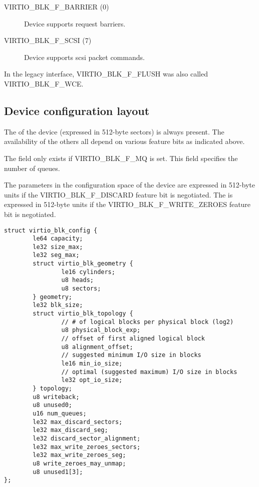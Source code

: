 \begin{description}
\item[VIRTIO_BLK_F_BARRIER (0)] Device supports request barriers.

\item[VIRTIO_BLK_F_SCSI (7)] Device supports scsi packet commands.
\end{description}

\begin{note}
  In the legacy interface, VIRTIO_BLK_F_FLUSH was also
  called VIRTIO_BLK_F_WCE.
\end{note}

\subsection{Device configuration layout}\label{sec:Device Types / Block Device / Device configuration layout}

The  of the device (expressed in 512-byte sectors) is always
present. The availability of the others all depend on various feature
bits as indicated above.

The field  only exists if VIRTIO_BLK_F_MQ is set. This field specifies
the number of queues.

The parameters in the configuration space of the device 
 are expressed in 512-byte units if the
VIRTIO_BLK_F_DISCARD feature bit is negotiated. The 
is expressed in 512-byte units if the VIRTIO_BLK_F_WRITE_ZEROES feature
bit is negotiated.

\begin{lstlisting}
struct virtio_blk_config {
        le64 capacity;
        le32 size_max;
        le32 seg_max;
        struct virtio_blk_geometry {
                le16 cylinders;
                u8 heads;
                u8 sectors;
        } geometry;
        le32 blk_size;
        struct virtio_blk_topology {
                // # of logical blocks per physical block (log2)
                u8 physical_block_exp;
                // offset of first aligned logical block
                u8 alignment_offset;
                // suggested minimum I/O size in blocks
                le16 min_io_size;
                // optimal (suggested maximum) I/O size in blocks
                le32 opt_io_size;
        } topology;
        u8 writeback;
        u8 unused0;
        u16 num_queues;
        le32 max_discard_sectors;
        le32 max_discard_seg;
        le32 discard_sector_alignment;
        le32 max_write_zeroes_sectors;
        le32 max_write_zeroes_seg;
        u8 write_zeroes_may_unmap;
        u8 unused1[3];
};
\end{lstlisting}


